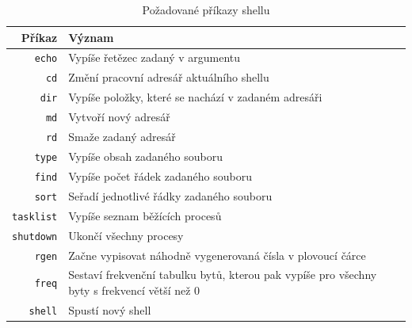 \documentclass[12pt, a4paper]{article}
\begin{document}
\begin{table}[!ht]
\centering
\begin{tabularx}{\textwidth}{r|p{11cm}}
\textbf{Příkaz} & \textbf{Význam}                                                                                                                 
\\
\hline
\texttt{echo}            & Vypíše řetězec zadaný v argumentu                                                                                                \\
\texttt{cd}              & Změní pracovní adresář aktuálního shellu                                                                                         \\
\texttt{dir}             & Vypíše položky, které se nachází v zadaném adresáři                                                                              \\
\texttt{md}              & Vytvoří nový adresář                                                                                                             \\
\texttt{rd}              & Smaže zadaný adresář
\\
\texttt{type}            & Vypíše obsah zadaného souboru                                                                                                    \\
\texttt{find}            & Vypíše počet řádek zadaného souboru                                                                                              \\
\texttt{sort}            & Seřadí jednotlivé řádky zadaného souboru                                                                                         \\
\texttt{tasklist}        & Vypíše seznam běžících procesů                                                                                                   \\
\texttt{shutdown}        & Ukončí všechny procesy                                                                                                           \\
\texttt{rgen}            & Začne vypisovat náhodně vygenerovaná čísla v plovoucí čárce                                                                      \\
\texttt{freq}            & Sestaví frekvenční tabulku bytů, kterou pak vypíše pro všechny byty s frekvencí větší než 0
\\
\texttt{shell}			 & Spustí nový shell
\end{tabularx}
\caption{Požadované příkazy shellu}
\end{table}
\end{document}
